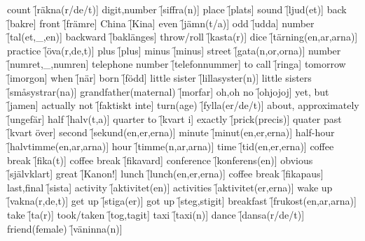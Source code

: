 \begin{questions}
    \begin{multicols}{2}
        \raggedcolumns
        \question count \f[räkna(r/de/t)]
        \question digit,number \f[siffra(n)]
        \question place \f[plats]
        \question sound \f[ljud(et)]
        \question back \f[bakre]
        \question front \f[främre]
        \question China \f[Kina]
        \question even \f[jämn(t/a)]
        \question odd  \f[udda]
        \question number \f[tal(et,\_,en)]
        \question backward \f[baklänges]
        \question throw/roll \f[kasta(r)]
        \question dice \f[tärning(en,ar,arna)]
        \question practice \f[öva(r,de,t)]
        \question plus \f[plus]
        \question minus \f[minus]
        \question street \f[gata(n,or,orna)]
        \question number \f[numret,\_,numren]
        \question telephone number \f[telefonnummer]
        \question to call \f[ringa]
        \question tomorrow \f[imorgon]
        \question when \f[när]
        \question born \f[född]
        \question little sister \f[lillasyster(n)]
        \question little sisters \f[småsystrar(na)]
        \question grandfather(maternal) \f[morfar]
        \question oh,oh no \f[ohjojoj]
        \question yet, but \f[jamen]
        \question actually not \f[faktiskt inte]
        \question turn(age) \f[fylla(er/de/t)]
        \question about, approximately \f[ungefär]
        \question half \f[halv(t,a)]
        \question quarter to \f[kvart i]
        \question exactly \f[prick(precis)]
        \question quater past \f[kvart över]
        \question second \f[sekund(en,er,erna)]
        \question minute \f[minut(en,er,erna)]
        \question half-hour \f[halvtimme(en,ar,arna)]
        \question hour \f[timme(n,ar,arna)]
        \question time \f[tid(en,er,erna)]
        \question coffee break \f[fika(t)]
        \question coffee break \f[fikavard]
        \question conference \f[konferens(en)]
        \question obvious \f[självklart]
        \question great \f[Kanon!]
        \question lunch \f[lunch(en,er,erna)]
        \question coffee break \f[fikapaus]
        \question last,final \f[sista]
        \question activity \f[aktivitet(en)]
        \question activities \f[aktivitet(er,erna)]
        \question wake up \f[vakna(r,de,t)]
        \question get up \f[stiga(er)]
        \question got up \f[steg,stigit]
        \question breakfast \f[frukost(en,ar,arna)]
        \question take \f[ta(r)]
        \question took/taken \f[tog,tagit]
        \question taxi \f[taxi(n)]
        \question dance \f[dansa(r/de/t)]
        \question friend(female) \f[väninna(n)]

\end{multicols}
\end{questions}
